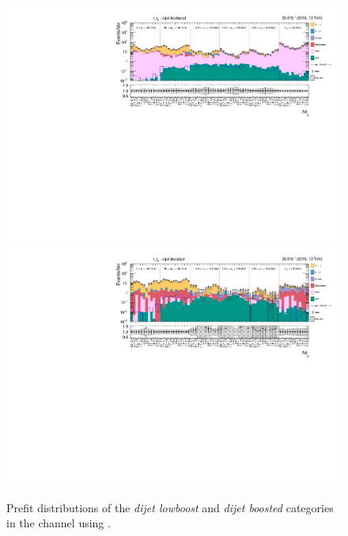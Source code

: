 \begin{figure}[h!]
        \centering
        \includegraphics[width=\textwidth]{Figures/statana/Postfit_JEC_jdphi/prefit_htt_tt_3_13TeV.pdf}\\
        \includegraphics[width=\textwidth]{Figures/statana/Postfit_JEC_jdphi/prefit_htt_tt_4_13TeV.pdf}         
    \caption{Prefit distributions of the \textit{dijet lowboost} and \textit{dijet boosted} categories in the \tautau{} channel  using \jdphi{}.}
\end{figure}
\clearpage
